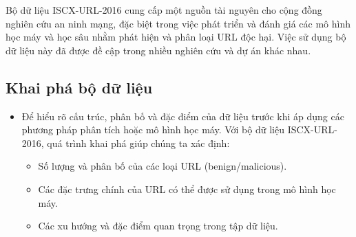 \documentclass[13pt]{article}
\begin{document}
Bộ dữ liệu ISCX-URL-2016 cung cấp một nguồn tài nguyên cho cộng đồng nghiên cứu an ninh mạng, đặc biệt trong việc phát triển và đánh giá các mô hình học máy và học sâu nhằm phát hiện và phân loại URL độc hại. Việc sử dụng bộ dữ liệu này đã được đề cập trong nhiều nghiên cứu và dự án khác nhau.

\subsection{Khai phá bộ dữ liệu}
\begin{itemize}
    \item Để hiểu rõ cấu trúc, phân bố và đặc điểm của dữ liệu trước khi áp dụng các phương pháp phân tích hoặc mô hình học máy. Với bộ dữ liệu ISCX-URL-2016, quá trình khai phá giúp chúng ta xác định:
    \begin{itemize}
        \item Số lượng và phân bố của các loại URL (benign/malicious).
        \item Các đặc trưng chính của URL có thể được sử dụng trong mô hình học máy.
        \item Các xu hướng và đặc điểm quan trọng trong tập dữ liệu.
    \end{itemize}
\end{itemize}
\end{document}
